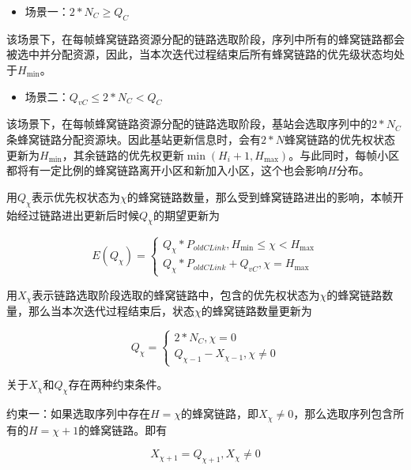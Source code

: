 \documentclass[figurelist,tablelist,algorithmlist,nomlist,masters]{seuthesix}
\begin{document}
	\begin{itemize}
		\item 场景一：$2*N_C \ge Q_C$
	\end{itemize}

	该场景下，在每帧蜂窝链路资源分配的链路选取阶段，序列中所有的蜂窝链路都会被选中并分配资源，因此，当本次迭代过程结束后所有蜂窝链路的优先级状态均处于${H_{\min }}$。

	\begin{itemize}
		\item 场景二：$Q_{vC} \le 2*N_C < Q_C$
	\end{itemize}

	该场景下，在每帧蜂窝链路资源分配的链路选取阶段，基站会选取序列中的$2*N_C$条蜂窝链路分配资源块。因此基站更新信息时，会有$2*N$蜂窝链路的优先权状态更新为${H_{\min }}$，其余链路的优先权更新$\min ({H_i} + 1,{H_{\max }})$。与此同时，每帧小区都将有一定比例的蜂窝链路离开小区和新加入小区，这个也会影响${H}$分布。


	用$Q_{\chi }$表示优先权状态为$\chi $的蜂窝链路数量，那么受到蜂窝链路进出的影响，本帧开始经过链路进出更新后时候$Q_{\chi }$的期望更新为

	\begin{equation}\label{eq3.1}
	E(Q_{\chi }) = \left\{ \begin{array}{l}
	Q_{\chi }*{P_{oldCLink}},{H_{\min }} \le \chi  < {H_{\max }}\\
	Q_{\chi }*{P_{oldCLink}} + Q_{vC},{\chi } = {H_{\max }}
	\end{array} \right.
	\end{equation}

	用$X_{\chi }$表示链路选取阶段选取的蜂窝链路中，包含的优先权状态为$\chi $的蜂窝链路数量，那么当本次迭代过程结束后，状态$\chi $的蜂窝链路数量更新为

	\begin{equation}\label{eq3.1}
	Q_\chi  = \left\{ \begin{array}{l}
	2*N_C,\chi  = 0\\
	Q_{\chi  - 1} - X_{\chi - 1},\chi \ne 0
	\end{array} \right.
	\end{equation}

	关于$X_{\chi }$和$Q_{\chi }$存在两种约束条件。

	约束一：如果选取序列中存在$H = \chi $的蜂窝链路，即$X_\chi \ne 0$，那么选取序列包含所有的$H = \chi + 1$的蜂窝链路。即有

	\begin{equation}\label{eq3.1}
	X_{\chi  + 1} = Q_{\chi  + 1},X_\chi \ne 0
	\end{equation}
\end{document}
